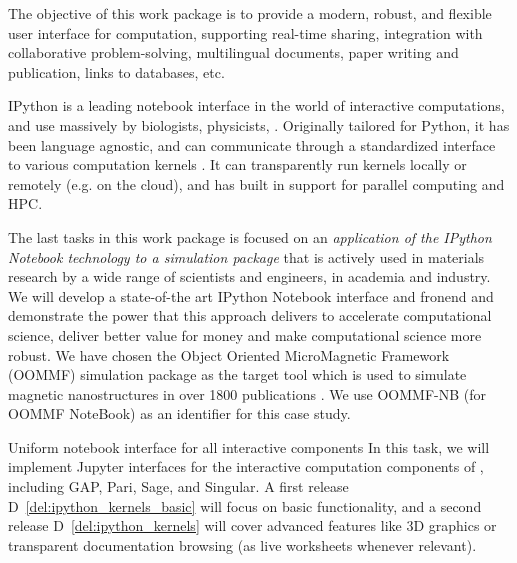 \addtocounter{wpno}{1}
\begin{Workpackage}{\thewpno}
\WPTitle{\wpname{\thewpno}}

\begin{WPObjectives}
  The objective of this work package is to provide a modern, robust,
  and flexible user interface for computation, supporting real-time
  sharing, integration with collaborative problem-solving,
  multilingual documents, paper writing and publication, links to
  databases, etc.
\end{WPObjectives}

\begin{WPDescription}


  IPython is a leading notebook interface in the world of interactive
  computations, and use massively by biologists, physicists, . Originally tailored for Python, it has been
  language agnostic, and can communicate through a standardized
  interface to various computation kernels . It can
  transparently run kernels locally or remotely (e.g. on the cloud),
  and has built in support for parallel computing and HPC.

  The last tasks in this work package is focused on an
  \emph{application of the IPython Notebook technology to a simulation
    package} that is actively used in materials research by a wide
  range of scientists and engineers, in academia and industry. We will
  develop a state-of-the art IPython Notebook interface and fronend
  and demonstrate the power that this approach delivers to accelerate
  computational science, deliver better value for money and make
  computational science more robust.  We have chosen the Object
  Oriented MicroMagnetic Framework (OOMMF) simulation package
  \cite{OOMMF-url} as the target tool which is used to simulate
  magnetic nanostructures in over 1800 publications
  \cite{OOMMF-citations-url}. We use OOMMF-NB (for OOMMF NoteBook) as
  an identifier for this case study.

\end{WPDescription}

\begin{task}{Uniform notebook interface for all interactive components}
  \label{task.ipython_kernels}
  In this task, we will implement Jupyter interfaces for the
  interactive computation components of \TheProject, including GAP,
  Pari, Sage, and Singular. A first release
  D~\ref{del:ipython_kernels_basic} will focus on basic functionality,
  and a second release D~\ref{del:ipython_kernels} will cover advanced
  features like 3D graphics or transparent documentation browsing (as
  live worksheets whenever relevant).


\end{task}
\end{Workpackage}
